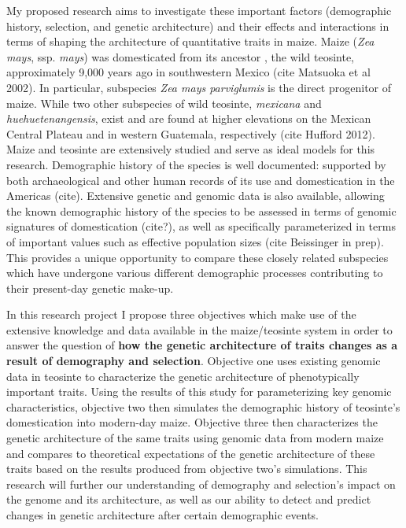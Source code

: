 My proposed research aims to investigate these important factors (demographic history, selection, and genetic architecture) and their effects and interactions in terms of shaping the architecture of quantitative traits in maize.  Maize (\emph{Zea mays}, ssp. \emph{mays}) was domesticated from its ancestor , the wild teosinte, approximately 9,000 years ago in southwestern Mexico (cite Matsuoka et al 2002). In particular, subspecies \emph{Zea mays parviglumis} is the direct progenitor of maize. While two other subspecies of wild teosinte, \emph{mexicana} and \emph{huehuetenangensis}, exist and are found at higher elevations on the Mexican Central Plateau and in western Guatemala, respectively (cite Hufford 2012). Maize and teosinte are extensively studied and serve as ideal models for this research. Demographic history of the species is well documented: supported by both archaeological and other human records of its use and domestication in the Americas (cite). Extensive genetic and genomic data is also available, allowing the known demographic history of the species to be assessed in terms of genomic signatures of domestication (cite?), as well as specifically parameterized in terms of important values such as effective population sizes (cite Beissinger in prep). This provides a unique opportunity to compare these closely related subspecies which have undergone various different demographic processes contributing to their present-day genetic make-up.

In this research project I propose three objectives which make use of the extensive knowledge and data available in the maize\//teosinte system in order to answer the question of \textbf{how the genetic architecture of traits changes as a result of demography and selection}. Objective one uses existing genomic data in teosinte to characterize the genetic architecture of phenotypically important traits. Using the results of this study for parameterizing key genomic characteristics, objective two then simulates the demographic history of teosinte's domestication into modern-day maize. Objective three then characterizes the genetic architecture of the same traits using genomic data from modern maize and compares to theoretical expectations of the genetic architecture of these traits based on the results produced from objective two's simulations. This research will further our understanding of demography and selection's impact on the genome and its architecture, as well as our ability to detect and predict changes in genetic architecture after certain demographic events.



